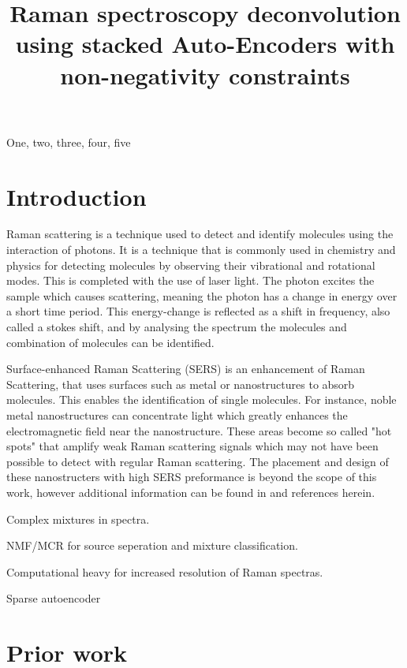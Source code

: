 \documentclass{article}
\title{Raman spectroscopy deconvolution using stacked Auto-Encoders with non-negativity constraints}
\begin{document}
%

\maketitle
%
\begin{abstract}

\end{abstract}
%
\begin{keywords}
One, two, three, four, five
\end{keywords}
%
\section{Introduction}
\label{sec:intro}

Raman scattering is a technique used to detect and identify molecules using the interaction of photons. It is a technique that is commonly used in chemistry and physics for detecting molecules by observing their vibrational and rotational modes. This is completed with the use of laser light. The photon excites the sample which causes scattering, meaning the photon has a change in energy over a short time period. This energy-change is reflected as a shift in frequency, also called a stokes shift, and by analysing the spectrum the molecules and combination of molecules can be identified. 

Surface-enhanced Raman Scattering (SERS) is an enhancement of Raman Scattering, that uses surfaces such as metal or nanostructures to absorb molecules. This enables the identification of single molecules.  For instance, noble metal nanostructures can concentrate light which greatly enhances the electromagnetic field near the nanostructure. These areas become so called "hot spots" that amplify weak Raman scattering signals which may not have been possible to detect with regular Raman scattering. The placement and design of these nanostructers with high SERS preformance is beyond the scope of this work, however additional information can be found in \cite{Wei2013} and references herein.

Complex mixtures in spectra.

NMF/MCR for source seperation and mixture classification.

Computational heavy for increased resolution of Raman spectras.

Sparse autoencoder

\section{Prior work}
\label{sec:prior}
\end{document}
